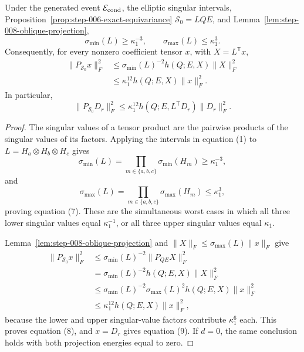 \begin{proposition}
\label{prop:step-008-elliptic-transfer}
Under the generated event \(\mathcal E_{\rm cond}\), the elliptic
singular intervals, Proposition~\ref{prop:step-006-exact-equivariance} \(\mathscr S_0=LQE\), and
Lemma~\ref{lem:step-008-oblique-projection},
\[
  \sigma_{\min}(L)\ge\kappa_1^{-3},
  \qquad
  \sigma_{\max}(L)\le\kappa_1^3.                          \tag{7}
\]
Consequently, for every nonzero coefficient tensor \(x\), with
\(X=L^{\mathsf T}x\),
\[
\begin{aligned}
  \|P_{\mathscr S_0}x\|_F^2
  &\le \sigma_{\min}(L)^{-2}
      h(Q;E,X)\|X\|_F^2\\
  &\le \kappa_1^{12}h(Q;E,X)\|x\|_F^2.
\end{aligned}\tag{8}
\]
In particular,
\[
  \|P_{\mathscr S_0}D_r\|_F^2
  \le\kappa_1^{12}h(Q;E,L^{\mathsf T}D_r)\|D_r\|_F^2.
                                                               \tag{9}
\]

\end{proposition}

\begin{proof}
The singular values of a tensor product are the
pairwise products of the singular values of its factors. Applying the
intervals in equation (1) to
\(L=H_a\otimes H_b\otimes H_c\) gives
\[
  \sigma_{\min}(L)
  =\prod_{m\in\{a,b,c\}}\sigma_{\min}(H_m)
  \ge\kappa_1^{-3},
\]
and
\[
  \sigma_{\max}(L)
  =\prod_{m\in\{a,b,c\}}\sigma_{\max}(H_m)
  \le\kappa_1^3,
\]
proving equation (7). These are the simultaneous worst cases in which all
three lower singular values equal \(\kappa_1^{-1}\), or all three upper
singular values equal \(\kappa_1\).

Lemma~\ref{lem:step-008-oblique-projection} and
\(\|X\|_F\le\sigma_{\max}(L)\|x\|_F\) give
\[
\begin{aligned}
  \|P_{\mathscr S_0}x\|_F^2
  &\le\sigma_{\min}(L)^{-2}\|P_{QE}X\|_F^2\\
  &=\sigma_{\min}(L)^{-2}h(Q;E,X)\|X\|_F^2\\
  &\le\sigma_{\min}(L)^{-2}\sigma_{\max}(L)^2
       h(Q;E,X)\|x\|_F^2\\
  &\le\kappa_1^{12}h(Q;E,X)\|x\|_F^2,
\end{aligned}\tag{10}
\]
because the lower and upper singular-value factors contribute
\(\kappa_1^6\) each. This proves equation (8), and \(x=D_r\) gives equation
(9). If \(d=0\), the same conclusion holds with both projection energies
equal to zero. 

\end{proof}


